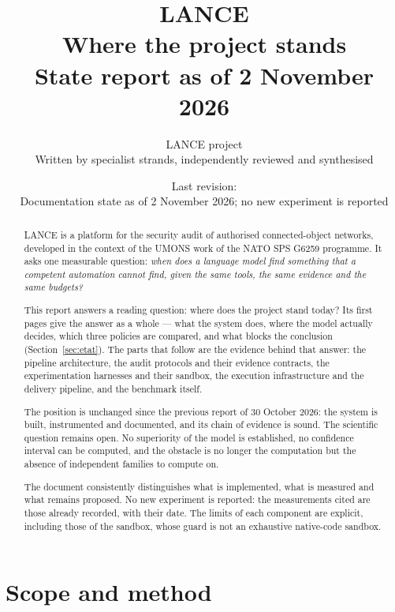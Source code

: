\documentclass[11pt,a4paper]{article}
\title{LANCE\\[4pt]
\large Where the project stands\\[2pt]
\normalsize State report as of 2 November 2026}
\author{LANCE project\\\small Written by specialist strands, independently reviewed and synthesised}
\date{Last revision: \revision\\[3pt]
\small Documentation state as of 2 November 2026; no new experiment is reported}
\begin{document}
\maketitle

\begin{abstract}
LANCE is a platform for the security audit of authorised connected-object
networks, developed in the context of the UMONS work of the NATO SPS G6259
programme. It asks one measurable question: \emph{when does a language model find
something that a competent automation cannot find, given the same tools, the same
evidence and the same budgets?}

This report answers a reading question: where does the project stand today? Its
first pages give the answer as a whole --- what the system does, where the model
actually decides, which three policies are compared, and what blocks the
conclusion (Section~\ref{sec:etat}). The parts that follow are the evidence behind
that answer: the pipeline architecture, the audit protocols and their evidence
contracts, the experimentation harnesses and their sandbox, the execution
infrastructure and the delivery pipeline, and the benchmark itself.

The position is unchanged since the previous report of 30 October 2026: the system
is built, instrumented and documented, and its chain of evidence is sound. The
scientific question remains open. No superiority of the model is established, no
confidence interval can be computed, and the obstacle is no longer the
computation but the absence of independent families to compute on.

The document consistently distinguishes what is implemented, what is measured and
what remains proposed. No new experiment is reported: the measurements cited are
those already recorded, with their date. The limits of each component are
explicit, including those of the sandbox, whose guard is not an exhaustive
native-code sandbox.
\end{abstract}

\tableofcontents
\clearpage



\clearpage


\section{Scope and method}
\label{sec:scope}
\end{document}
